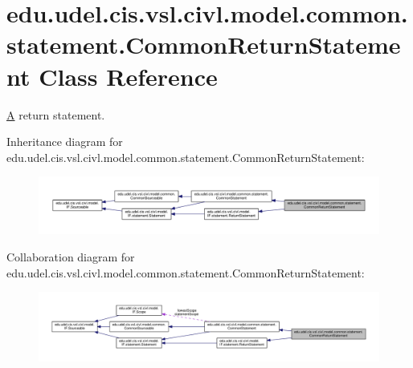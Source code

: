 \hypertarget{classedu_1_1udel_1_1cis_1_1vsl_1_1civl_1_1model_1_1common_1_1statement_1_1CommonReturnStatement}{}\section{edu.\+udel.\+cis.\+vsl.\+civl.\+model.\+common.\+statement.\+Common\+Return\+Statement Class Reference}
\label{classedu_1_1udel_1_1cis_1_1vsl_1_1civl_1_1model_1_1common_1_1statement_1_1CommonReturnStatement}


\hyperlink{structA}{A} return statement.  




Inheritance diagram for edu.\+udel.\+cis.\+vsl.\+civl.\+model.\+common.\+statement.\+Common\+Return\+Statement\+:
\nopagebreak
\begin{figure}[H]
\begin{center}
\leavevmode
\includegraphics[width=350pt]{classedu_1_1udel_1_1cis_1_1vsl_1_1civl_1_1model_1_1common_1_1statement_1_1CommonReturnStatement__inherit__graph}
\end{center}
\end{figure}


Collaboration diagram for edu.\+udel.\+cis.\+vsl.\+civl.\+model.\+common.\+statement.\+Common\+Return\+Statement\+:
\nopagebreak
\begin{figure}[H]
\begin{center}
\leavevmode
\includegraphics[width=350pt]{classedu_1_1udel_1_1cis_1_1vsl_1_1civl_1_1model_1_1common_1_1statement_1_1CommonReturnStatement__coll__graph}
\end{center}
\end{figure}
